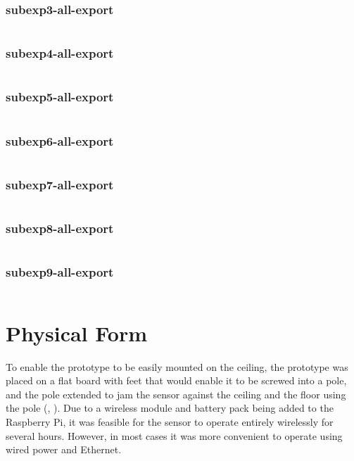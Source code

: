 \subsection{subexp3-all-export}
\inputminted[fontsize=\footnotesize,breaklines=true]{text}{../data/processed/classification-expset-1/subexp3-all-export.txt}
\clearpage

\subsection{subexp4-all-export}
\inputminted[fontsize=\footnotesize,breaklines=true]{text}{../data/processed/classification-expset-1/subexp4-all-export.txt}
\clearpage

\subsection{subexp5-all-export}
\inputminted[fontsize=\footnotesize,breaklines=true]{text}{../data/processed/classification-expset-1/subexp5-all-export.txt}
\clearpage

\subsection{subexp6-all-export}
\inputminted[fontsize=\footnotesize,breaklines=true]{text}{../data/processed/classification-expset-1/subexp6-all-export.txt}
\clearpage

\subsection{subexp7-all-export}
\inputminted[fontsize=\footnotesize,breaklines=true]{text}{../data/processed/classification-expset-1/subexp7-all-export.txt}
\clearpage

\subsection{subexp8-all-export}
\inputminted[fontsize=\footnotesize,breaklines=true]{text}{../data/processed/classification-expset-1/subexp8-all-export.txt}
\clearpage

\subsection{subexp9-all-export}
\inputminted[fontsize=\footnotesize,breaklines=true]{text}{../data/processed/classification-expset-1/subexp9-all-export.txt}
\clearpage


\chapter{Physical Form}
To enable the prototype to be easily mounted on the ceiling, the prototype was placed on a flat board with feet that would enable it to be screwed into a pole, and the pole extended to jam the sensor against the ceiling and the floor using the pole (, ). Due to a wireless module and battery pack being added to the Raspberry Pi, it was feasible for the sensor to operate entirely wirelessly for several hours. However, in most cases it was more convenient to operate using wired power and Ethernet.

